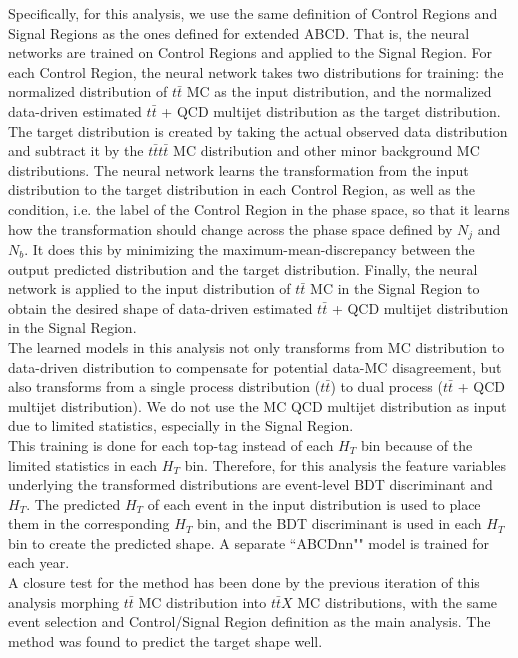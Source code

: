 \documentclass[twoside]{article}
\begin{document}
Specifically, for this analysis, we use the same definition of Control Regions and Signal Regions as the ones defined for extended ABCD. That is, the neural networks are trained on Control Regions and applied to the Signal Region. For each Control Region, the neural network takes two distributions for training: the normalized distribution of $t\bar{t}$ MC as the input distribution, and the normalized data-driven estimated $t\bar{t}$ + QCD multijet distribution as the target distribution. The target distribution is created by taking the actual observed data distribution and subtract it by the $t\bar{t}t\bar{t}$ MC distribution and other minor background MC distributions. The neural network learns the transformation from the input distribution to the target distribution in each Control Region, as well as the condition, i.e. the label of the Control Region in the phase space, so that it learns how the transformation should change across the phase space defined by $N_j$ and $N_b$. It does this by minimizing the maximum-mean-discrepancy between the output predicted distribution and the target distribution. Finally, the neural network is applied to the input distribution of $t\bar{t}$ MC in the Signal Region to obtain the desired shape of data-driven estimated $t\bar{t}$ + QCD multijet distribution in the Signal Region.\\

The  learned models in this analysis not only transforms from MC distribution to data-driven distribution to compensate for potential data-MC disagreement, but also transforms from a single process distribution ($t\bar{t}$) to dual process ($t\bar{t}$ + QCD multijet distribution). We do not use the MC QCD multijet distribution as input due to limited statistics, especially in the Signal Region.\\

This training is done for each top-tag instead of each $H_T$ bin because of the limited statistics in each $H_T$ bin. Therefore, for this analysis the feature variables underlying the transformed distributions are event-level BDT discriminant and $H_T$. The predicted $H_T$ of each event in the input distribution is used to place them in the corresponding $H_T$ bin, and the BDT discriminant is used in each $H_T$ bin to create the predicted shape. A separate ``ABCDnn"" model is trained for each year.\\

A closure test for the method has been done by the previous iteration of this analysis morphing $t\bar{t}$ MC distribution into $t\bar{t}X$ MC distributions, with the same event selection and Control/Signal Region definition as the main analysis. The method was found to predict the target shape well.\\
\end{document}
